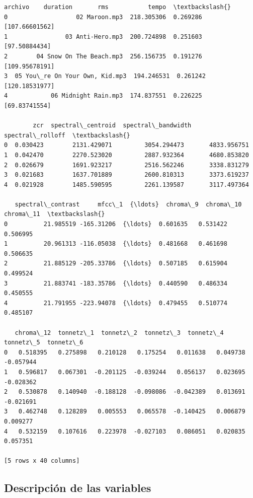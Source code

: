 \documentclass[11pt]{article}
\makeatletter
\newcommand{\boxspacing}{\kern\kvtcb@left@rule\kern\kvtcb@boxsep}
\newcommand{\prompt}[4]{
        {\ttfamily\llap{{\color{#2}[#3]:\hspace{3pt}#4}}\vspace{-\baselineskip}}
    }
\makeatother
\begin{document}
            \begin{tcolorbox}[breakable, size=fbox, boxrule=.5pt, pad at break*=1mm, opacityfill=0]
\prompt{Out}{outcolor}{8}{\boxspacing}
\begin{Verbatim}[commandchars=\\\{\}]
                          archivo    duration       rms           tempo  \textbackslash{}
0                   02 Maroon.mp3  218.305306  0.269286  [107.66601562]
1                03 Anti-Hero.mp3  200.724898  0.251603   [97.50884434]
2        04 Snow On The Beach.mp3  256.156735  0.191276  [109.95678191]
3  05 You\_re On Your Own, Kid.mp3  194.246531  0.261242  [120.18531977]
4            06 Midnight Rain.mp3  174.837551  0.226225   [69.83741554]

        zcr  spectral\_centroid  spectral\_bandwidth  spectral\_rolloff  \textbackslash{}
0  0.030423        2131.429071         3054.294473       4833.956751
1  0.042470        2270.523020         2887.932364       4680.853820
2  0.026679        1691.923217         2516.562246       3338.831279
3  0.021683        1637.701889         2600.810313       3373.619237
4  0.021928        1485.590595         2261.139587       3117.497364

   spectral\_contrast     mfcc\_1  {\ldots}  chroma\_9  chroma\_10  chroma\_11  \textbackslash{}
0          21.985519 -165.31206  {\ldots}  0.601635   0.531422   0.506995
1          20.961313 -116.05038  {\ldots}  0.481668   0.461698   0.506635
2          21.885129 -205.33786  {\ldots}  0.507185   0.615904   0.499524
3          21.883741 -183.35786  {\ldots}  0.440590   0.486334   0.450555
4          21.791955 -223.94078  {\ldots}  0.479455   0.510774   0.485107

   chroma\_12  tonnetz\_1  tonnetz\_2  tonnetz\_3  tonnetz\_4  tonnetz\_5  tonnetz\_6
0   0.518395   0.275898   0.210128   0.175254   0.011638   0.049738  -0.057944
1   0.596817   0.067301  -0.201125  -0.039244   0.056137   0.023695  -0.028362
2   0.530878   0.140940  -0.188128  -0.098086  -0.042389   0.013691  -0.021691
3   0.462748   0.128289   0.005553   0.065578  -0.140425   0.006879   0.009277
4   0.532159   0.107616   0.223978  -0.027103   0.086051   0.020835   0.057351

[5 rows x 40 columns]
\end{Verbatim}
\end{tcolorbox}
        
    \hypertarget{descripciuxf3n-de-las-variables}{%
\subsection{Descripción de las
variables}\label{descripciuxf3n-de-las-variables}}
\end{document}
